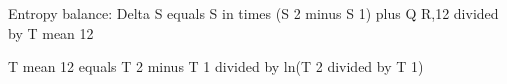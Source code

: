 Entropy balance:  
Delta S equals S in times (S 2 minus S 1) plus Q R,12 divided by T mean 12  

T mean 12 equals T 2 minus T 1 divided by ln(T 2 divided by T 1)